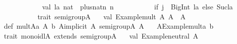 \begin{isabellebody}
\begin{isamarkuptext}
\ \ \ \ \ \ \ \ \ \ \ val\ la{}\ nat\ {}\ plus{}nat{}n{}\ n{}{}\isanewline
\ \ \ \ \ \ \ \ \ \ \ {}if\ {}j\ {}{}\ BigInt{}{}{}{}\ la\ else\ Suc{}la{}{}\isanewline
\ \ \ \ \ \ \ \ \ {}{}\isanewline
\isanewline
trait\ semigroup{}A{}\ {}\isanewline
\ \ val\ {}Example{}mult{}{}\ {}A{}\ A{}\ {}{}\ A\isanewline
{}\isanewline
def\ mult{}A{}{}a{}\ A{}\ b{}\ A{}{}implicit\ A{}\ semigroup{}A{}{}{}\ A\ {}\isanewline
\ \ A{}{}Example{}mult{}{}a{}\ b{}\isanewline
\isanewline
trait\ monoidl{}A{}\ extends\ semigroup{}A{}\ {}\isanewline
\ \ val\ {}Example{}neutral{}{}\ A\isanewline

\end{isamarkuptext}
\end{isabellebody}
